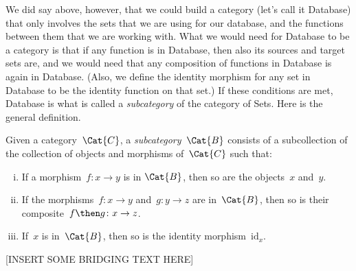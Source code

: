 We did say above, however, that we could build a category (let's call it \textsf{Database}) that only involves the sets that we are using for our database, and the functions between them that we are working with. What we would need for \textsf{Database} to be a category is that if any function is in \textsf{Database}, then also its sources and target sets are, and we would need that any composition of functions in \textsf{Database} is again in \textsf{Database}. (Also, we define the identity morphism for any set in \textsf{Database} to be the identity function on that set.) If these conditions are met, \textsf{Database} is what is called a \emph{subcategory} of the category of Sets. Here is the general definition. 

\begin{shaded*}
\begin{definition}[Subcategory]
\label{def:subcategory}
	Given a category~$\Cat{C}$, a \emph{subcategory}~$\Cat{B}$ consists of a subcollection of the collection of objects and morphisms of~$\Cat{C}$ such that:
	\begin{enumerate}[(i)]
	\item If a morphism~$f \colon x\to y$ is in $\Cat{B}$, then so are the objects~$x$ and~$y$.
	\item If the morphisms~$f\colon x\to y$ and~$g\colon y\to z$ are in~$\Cat{B}$, then so is their composite~$f\then g\colon x\to z$.
	\item If~$x$ is in~$\Cat{B}$, then so is the identity morphism~$\text{id}_x$.
	\end{enumerate}
\end{definition}
\end{shaded*}


[INSERT SOME BRIDGING TEXT HERE]


